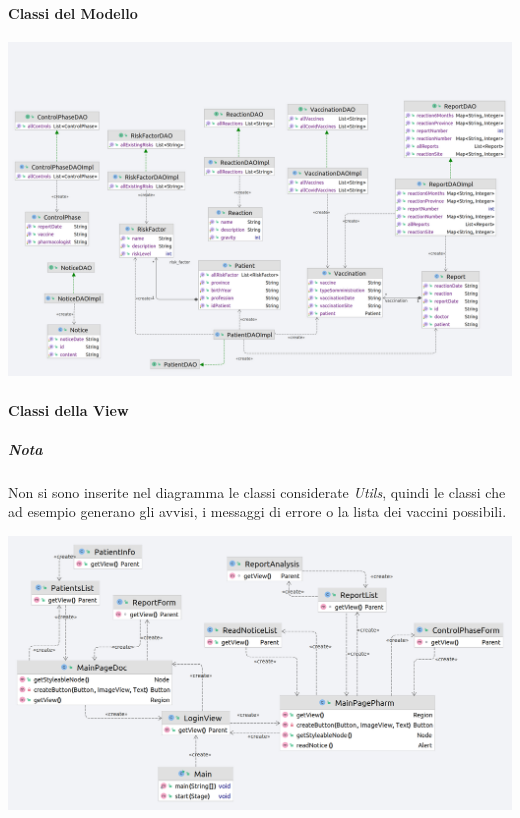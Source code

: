 \documentclass{article}
\begin{document}
    \paragraph*{Classi del Modello}
        \begin{center}
            \includegraphics[width=1\textwidth]{pictures/DAOInteraction.png}
        \end{center}
\newpage
    \paragraph*{Classi della View}
        \subparagraph*{Nota} Non si sono inserite nel diagramma le classi considerate \textit{Utils}, quindi le classi che ad esempio generano gli avvisi, i messaggi di errore o la lista dei vaccini possibili.
        \begin{center}
            \includegraphics[width=1\textwidth]{pictures/ViewInteraction.png}
        \end{center}
\newpage
\end{document}
